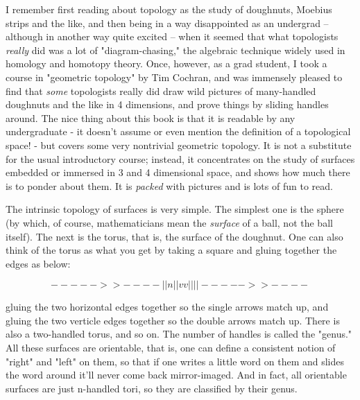 I remember first reading about topology as the study of doughnuts,
Moebius strips and the like, and then being in a way disappointed as an
undergrad -- although in another way quite excited --  when it seemed
that what topologists \emph{really} did was a lot of "diagram-chasing," the
algebraic technique widely used in homology and homotopy theory.  Once,
however, as a grad student, I took a course in "geometric topology" by
Tim Cochran, and was immensely pleased to find that \emph{some} topologists
really did draw wild pictures of many-handled doughnuts and the like in
4 dimensions, and prove things by sliding handles around.  The nice
thing about this book is that it is readable by any undergraduate - it
doesn't assume or even mention the definition of a topological space! -
but covers some very nontrivial geometric topology.  It is not a
substitute for the usual introductory course; instead, it concentrates
on the study of surfaces embedded or immersed in 3 and 4 dimensional
space, and shows how much there is to ponder about them.  It is \emph{packed}
with pictures and is lots of fun to read.

The intrinsic topology of surfaces is very simple.  The simplest one is
the sphere (by which, of course, mathematicians mean the \emph{surface} of a
ball, not the ball itself).  The next is the torus, that is, the surface
of the doughnut.   One can also think of the torus as what you get by
taking a square and gluing together the edges as below:


$$
     ----->>----
    |           |n
    |           |  
    v           v
    |           |
    |           |
     ----->>----

$$
    

gluing the two horizontal edges together so the single arrows match up, and
gluing the two verticle edges together so the double arrows match up.
There is also a two-handled torus, and so on.  The number of handles is called
the "genus."   All these surfaces are orientable, that is, one can
define a consistent notion of "right" and "left" on them, so that if one
writes a little word on them and slides the word around it'll never come
back mirror-imaged.  And in fact, all orientable surfaces are just
n-handled tori, so they are classified by their genus.  

